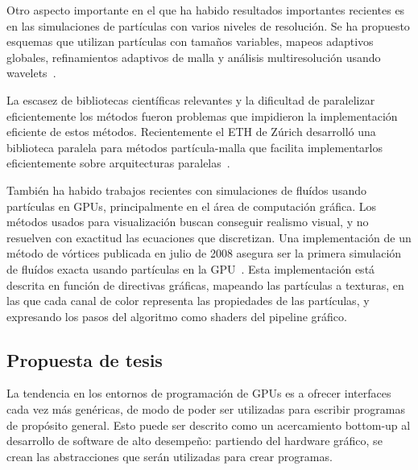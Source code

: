 \documentclass[11pt,spanish]{article}
\newcommand{\vel}{\mathbf{u}}
\newcommand{\vort}{\mathbf{\omega}}
\begin{document}
Otro aspecto importante en el que ha habido resultados importantes recientes es
en las simulaciones de partículas con varios niveles de resolución.  Se ha
propuesto esquemas que utilizan
partículas con tamaños variables,
mapeos adaptivos globales,
refinamientos adaptivos de malla
y análisis multiresolución usando wavelets~\cite{multiresolution}.

La escasez de bibliotecas científicas relevantes y la dificultad de paralelizar
eficientemente los métodos fueron problemas que impidieron la implementación
eficiente de estos métodos.  Recientemente el ETH de Zúrich desarrolló una
biblioteca paralela para métodos partícula-malla que facilita implementarlos
eficientemente sobre arquitecturas paralelas~\cite{ppm}.

También ha habido trabajos recientes con simulaciones de fluídos usando partículas
en GPUs, principalmente en el área de computación gráfica.  Los métodos usados
para visualización buscan conseguir realismo visual, y no resuelven con
exactitud las ecuaciones que discretizan.  Una implementación de un método de
vórtices publicada en julio de 2008 asegura ser la primera simulación de fluídos
exacta usando partículas en la GPU~\cite{vortex-gpu}.  Esta implementación está
descrita en función de directivas gráficas, mapeando las partículas a texturas,
en las que cada canal de color representa las propiedades de las partículas, y
expresando los pasos del algoritmo como shaders del pipeline gráfico.




\subsection{Propuesta de tesis}
La tendencia en los entornos de programación de GPUs es a ofrecer interfaces
cada vez más genéricas, de modo de poder ser utilizadas para escribir programas
de propósito general.  Esto puede ser descrito como un acercamiento bottom-up
al desarrollo de software de alto desempeño:  partiendo del hardware gráfico,
se crean las abstracciones que serán utilizadas para crear programas.
\end{document}
